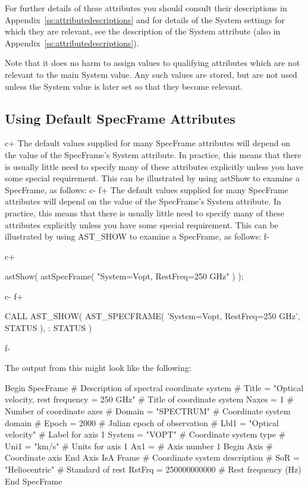 \documentclass[twoside,11pt]{starlink}
\providecommand{\appref}[1]{Appendix~\ref{#1}}
\begin{document}
For further details of these attributes you should consult their
descriptions in \appref{ss:attributedescriptions} and for details of
the System settings for which they are relevant, see the description
of the System attribute (also in \appref{ss:attributedescriptions}).

Note that it does no harm to assign values to qualifying attributes
which are not relevant to the main System value. Any such values are
stored, but are not used unless the System value is later set so that
they become relevant.

\subsection{Using Default SpecFrame Attributes}

c+
The default values supplied for many SpecFrame attributes will depend
on the value of the SpecFrame's System attribute. In practice, this
means that there is usually little need to specify many of these
attributes explicitly unless you have some special requirement. This
can be illustrated by using astShow to examine a SpecFrame, as follows:
c-
f+
The default values supplied for many SpecFrame attributes will depend
on the value of the SpecFrame's System attribute. In practice, this
means that there is usually little need to specify many of these
attributes explicitly unless you have some special requirement. This
can be illustrated by using AST\_SHOW to examine a SpecFrame, as
follows:
f-

c+
\small
\begin{terminalv}
astShow( astSpecFrame( "System=Vopt, RestFreq=250 GHz" ) );
\end{terminalv}
\normalsize
c-
f+
\small
\begin{terminalv}
      CALL AST_SHOW( AST_SPECFRAME( 'System=Vopt, RestFreq=250 GHz', STATUS ),
     :               STATUS )
\end{terminalv}
\normalsize
f-

The output from this might look like the following:

\begin{terminalv}
 Begin SpecFrame        # Description of spectral coordinate system
#   Title = "Optical velocity, rest frequency = 250 GHz"       # Title
of coordinate system
    Naxes = 1   # Number of coordinate axes
#   Domain = "SPECTRUM"         # Coordinate system domain
#   Epoch = 2000        # Julian epoch of observation
#   Lbl1 = "Optical velocity"  # Label for axis 1
    System = "VOPT"     # Coordinate system type
#   Uni1 = "km/s"       # Units for axis 1
    Ax1 =       # Axis number 1
       Begin Axis       # Coordinate axis
       End Axis
 IsA Frame      # Coordinate system description
#   SoR = "Heliocentric"        # Standard of rest
    RstFrq = 250000000000       # Rest frequency (Hz)
 End SpecFrame
\end{terminalv}
\end{document}
